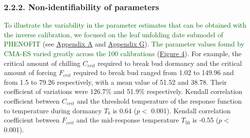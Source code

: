 \documentclass[11pt,]{article}
\begin{document}
\hypertarget{non-identifiability-of-parameters}{%
\subsubsection{2.2.2. Non-identifiability of
parameters}\label{non-identifiability-of-parameters}}

\textcolor{darkgreen}{To illustrate the variability in the parameter estimates that can be obtained with the inverse calibration, we focused on the leaf unfolding date submodel of PHENOFIT}
(see \protect\hyperlink{appendixA}{Appendix A} and
\protect\hyperlink{appendixG}{Appendix G}).
\textcolor{darkgreen}{The parameter values found by CMA-ES varied greatly across the 100 calibrations}
(\hyperref[fig:unfoldingplots]{Figure 4}). For example, the critical
amount of chilling \(C_{crit}\) required to break bud dormancy and the
critical amount of forcing \(F_{crit}\) required to break bud ranged
from 1.02 to 149.96 and from 1.5 to 79.26 respectively, with a mean
value of 51.52 and 38.78. Their coefficient of variations were 126.7\%
and 51.9\% respectively. Kendall correlation coefficient between
\(C_{crit}\) and the threshold temperature of the response function to
temperature during dormancy \(T_b\) is 0.64 (\(p <\) 0.001). Kendall
correlation coefficient between \(F_{crit}\) and the mid-response
temperature \(T_{50}\) is -0.55 (\(p <\) 0.001).
\end{document}
